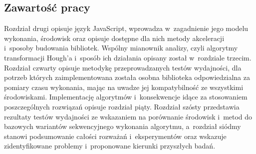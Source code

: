 \subsection{Zawartość pracy}

Rozdział drugi opisuje język JavaScript, wprowadza w~zagadnienie jego modelu wykonania, środowisk oraz opisuje dostępne dla nich metody akceleracji i~sposoby budowania bibliotek. Wspólny mianownik analizy, czyli algorytmy transformacji Hough'a i~sposób ich działania opisany został w~rozdziale trzecim. Rozdział czwarty opisuje metodykę przeprowadzanych testów wydajności, dla potrzeb których zaimplementowana została osobna biblioteka odpowiedzialna za pomiary czasu wykonania, mając na uwadze jej kompatybilność ze wszystkimi środowiskami. Implementację algorytmów i~konsekwencje idące za stosowaniem poszczególnych rozwiązań opisuje rozdział piąty. Rozdział szósty przedstawia rezultaty testów wydajności ze wskazaniem na porównanie środowisk i~metod do bazowych wariantów sekwencyjnego wykonania algorytmu, a~rozdział siódmy stanowi podsumowanie całości rozważań i~eksperymentów oraz wskazuje zidentyfikowane problemy i~proponowane kierunki przyszłych badań.
